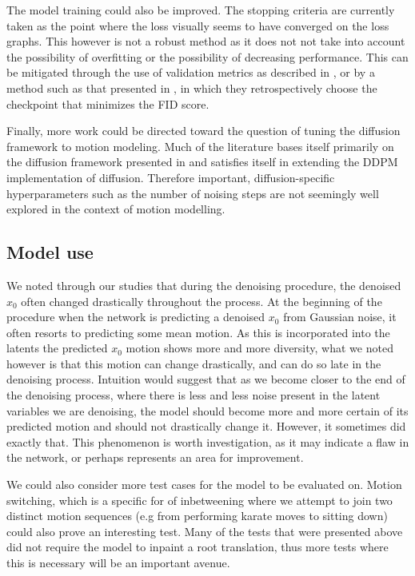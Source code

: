 The model training could also be improved. The stopping criteria are currently taken as the point where the loss visually seems to have converged on the loss graphs. This however is not a robust method as it does not not take into account the possibility of overfitting or the possibility of decreasing performance. This can be mitigated through the use of validation metrics as described in , or by a method such as that presented in \cite{MDM}, in which they retrospectively choose the checkpoint that minimizes the FID score.

Finally, more work could be directed toward the question of tuning the diffusion framework to motion modeling. Much of the literature \cite{EDGE,MDM,PhysDiff} bases itself primarily on the diffusion framework presented in \cite{ddpm} and satisfies itself in extending the DDPM implementation of diffusion. Therefore important, diffusion-specific hyperparameters such as the number of noising steps are not seemingly well explored in the context of motion modelling.

\subsection{Model use}

We noted through our studies that during the denoising procedure, the denoised $x_0$ often changed drastically throughout the process. At the beginning of the procedure when the network is predicting a denoised $x_0$ from Gaussian noise, it often resorts to predicting some mean motion. As this is incorporated into the latents the predicted $x_0$ motion shows more and more diversity, what we noted however is that this motion can change drastically, and can do so late in the denoising process. Intuition would suggest that as we become closer to the end of the denoising process, where there is less and less noise present in the latent variables we are denoising, the model should become more and more certain of its predicted motion and should not drastically change it. However, it sometimes did exactly that. This phenomenon is worth investigation, as it may indicate a flaw in the network, or perhaps represents an area for improvement.

We could also consider more test cases for the model to be evaluated on. Motion switching, which is a specific for of inbetweening where we attempt to join two distinct motion sequences (e.g from performing karate moves to sitting down) could also prove an interesting test. Many of the tests that were presented above did not require the model to inpaint a root translation, thus more tests where this is necessary will be an important avenue.

